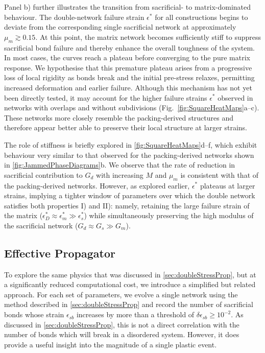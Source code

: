 \begin{subappendices}
Panel b) further illustrates the transition from sacrificial- to matrix-dominated behaviour. The double-network failure strain $\epsilon^*$ for all constructions begins to deviate from the corresponding single sacrificial network at approximately $\mu_m \gtrsim 0.15$. At this point, the matrix network becomes sufficiently stiff to suppress sacrificial bond failure and thereby enhance the overall toughness of the system. In most cases, the curves reach a plateau before converging to the pure matrix response. We hypothesise that this premature plateau arises from a progressive loss of local rigidity as bonds break and the initial pre-stress relaxes, permitting increased deformation and earlier failure. Although this mechanism has not yet been directly tested, it may account for the higher failure strains $\epsilon^*$ observed in networks with overlaps and without subdivisions (Fig.~\cref{fig:SquareHeatMaps}a–c). These networks more closely resemble the packing-derived structures and therefore appear better able to preserve their local structure at larger strains.

The role of stiffness is briefly explored in \cref{fig:SquareHeatMaps}d–f, which exhibit behaviour very similar to that observed for the packing-derived networks shown in \cref{fig:JammedPhaseDiagrams}b. We observe that the rate of reduction in sacrificial contribution to $G_d$ with increasing $M$ and $\mu_m$ is consistent with that of the packing-derived networks. However, as explored earlier, $\epsilon^*$ plateaus at larger strains, implying a tighter window of parameters over which the double network satisfies both properties I) and II): namely, retaining the large failure strain of the matrix ($\epsilon^*_D \approx \epsilon^*_m \gg \epsilon^*_s$) while simultaneously preserving the high modulus of the sacrificial network ($G_d \approx G_s \gg G_m$).

\subsection{Effective Propagator}

To explore the same physics that was discussed in \cref{sec:doubleStressProp}, but at a significantly reduced computational cost, we introduce a simplified but related approach. For each set of parameters, we evolve a single network using the method described in \cref{sec:doubleStressProp} and record the number of sacrificial bonds whose strain $\epsilon_{sb}$ increases by more than a threshold of $\delta\epsilon_{sb} \geq 10^{-2}$. As discussed in \cref{sec:doubleStressProp}, this is not a direct correlation with the number of bonds which will break in a disordered system. However, it does provide a useful insight into the magnitude of a single plastic event.


\end{subappendices}
